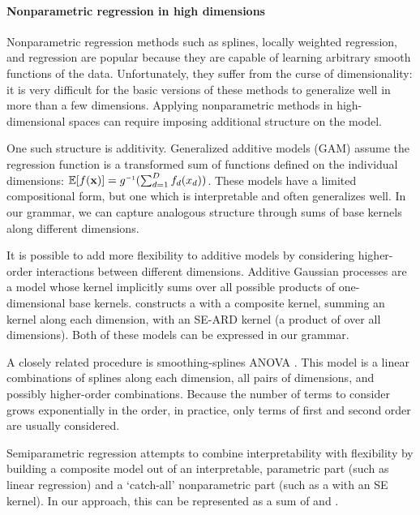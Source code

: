 \documentclass[twoside]{article}
\begin{document}
\paragraph{Nonparametric regression in high dimensions}
Nonparametric regression methods such as splines, locally weighted regression, and \gp{} regression are popular because they are capable of learning arbitrary smooth functions of the data.
Unfortunately, they suffer from the curse of dimensionality: it is very difficult for the basic versions of these methods to generalize well in more than a few dimensions.
Applying nonparametric methods in high-dimensional spaces can require imposing additional structure on the model.

One such structure is additivity.
Generalized additive models (GAM) assume the regression function is a transformed sum of functions defined on the individual dimensions: $\expect[f(\vx)] = g\inv(\sum_{d=1}^D f_d(x_d))$.
These models have a limited compositional form, but one which is interpretable and often generalizes well.
In our grammar, we can capture analogous structure through sums of base kernels along different dimensions.

It is possible to add more flexibility to additive models by considering higher-order interactions between different dimensions. 
Additive Gaussian processes \cite{duvenaud2011additive11} are a \gp{} model whose kernel implicitly sums over all possible products of one-dimensional base kernels.  
\citet{plate1999accuracy} constructs a \gp{} with a composite kernel, summing an \kSE{} kernel along each dimension, with an SE-ARD kernel (\ie a product of \kSE{} over all dimensions).
Both of these models can be expressed in our grammar.

A closely related procedure is smoothing-splines ANOVA \cite{wahba1990spline, gu2002smoothing}.
This model is a linear combinations of splines along each dimension, all pairs of dimensions, and possibly higher-order combinations.
Because the number of terms to consider grows exponentially in the order, in practice, only terms of first and second order are usually considered.

Semiparametric regression \citep[e.g.][]{ruppert2003semiparametric} attempts to combine interpretability with flexibility by building  a composite model out of an interpretable, parametric part (such as linear regression) and a `catch-all' nonparametric part (such as a \gp{} with an SE kernel).
In our approach, this can be represented as a sum of \kSE{} and \kLin{}.
\end{document}
